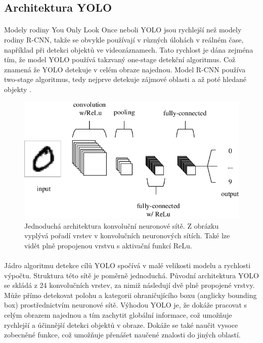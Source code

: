 \pagebreak
\subsection*{Architektura YOLO}
\paragraph{} Modely rodiny You Only Look Once neboli YOLO \cite{yolo1} jsou rychlejší než modely rodiny R-CNN, takže se obvykle používají v různých úlohách v reálném čase, například při detekci objektů ve videozáznamech. Tato rychlost je dána zejména tím, že model YOLO používá takzvaný one-stage detekční algoritmus. Což znamená že YOLO detekuje v celém obraze najednou. Model R-CNN používa two-stage algoritmus, tedy nejprve detekuje zájmové oblasti a až poté hledané objekty \cite{rcnn-yolo}.
\begin{figure}[h]\centering
    \centering
    \includegraphics[width=0.8\linewidth]{obrazky-figures/cnn1.png}
    \caption{Jednoduchá architektura konvoluční neuronové sítě. Z obrázku vyplývá pořadí vrstev v konvolučních neuronových sítích. Také lze vidět plně propojenou vrstvu s aktivační funkcí ReLu\protect\footnotemark{}.}
    \label{cnn1}
\end{figure}
\paragraph{}
Jádro algoritmu detekce cílů YOLO spočívá v malé velikosti modelu a rychlosti výpočtu. Struktura této sítě je poměrně jednoduchá. Původní architektura YOLO se skládá z 24 konvolučních vrstev, za nimiž následují dvě plně propojené vrstvy. Může přímo detekovat polohu a kategorii ohraničujícího boxu (anglicky bounding box) prostřednictvím neuronové sítě. Výhodou YOLO je, že dokáže pracovat s celým obrazem najednou a tím zachytit globální informace, což umožňuje rychlejší a účinnější detekci objektů v obraze. Dokáže se také naučit vysoce zobecněné funkce, což umožňuje přenášet naučené znalosti do jiných oblastí.
